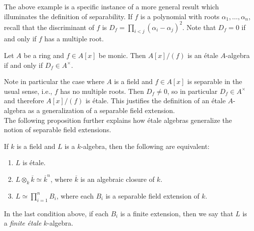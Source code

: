 \documentclass[11pt,openany]{book} %
\begin{document}
The above example is a specific instance of a more general result which illuminates the definition of separability. If $f$ is a polynomial with roots $\alpha_1,\ldots,\alpha_n$, recall that the discriminant of $f$ is $D_f = \prod_{i < j} (\alpha_i - \alpha_j)^2$. Note that $D_f = 0$ if and only if $f$ has a multiple root.

\begin{proposition}
Let $A$ be a ring and $f \in A[x]$ be monic. Then $A[x]/(f)$ is an \'etale $A$-algebra if and only if $D_f \in A^{\times}$.
\end{proposition}
\medskip

Note in particular the case where $A$ is a field and $f \in A[x]$ is separable in the usual sense, i.e., $f$ has no multiple roots. Then $D_f \neq 0$, so in particular $D_f \in A^{\times}$ and therefore $A[x]/(f)$ is \'etale. This justifies the definition of an \'etale $A$-algebra as a generalization of a separable field extension.\\

The following proposition further explains how \'etale algebras generalize the notion of separable field extensions.

\begin{proposition} \label{etalealgebra}
If $k$ is a field and $L$ is a $k$-algebra, then the following are equivalent:
\begin{enumerate}
	\item $L$ is \'etale.
	\item $L \otimes_k \overline{k} \simeq \overline{k}^n$, where $\overline{k}$ is an algebraic closure of $k$.
    \item $L \simeq \prod_{i=1}^{n} B_i$, where each $B_i$ is a separable field extension of $k$.
\end{enumerate}
\end{proposition}

In the last condition above, if each $B_i$ is a finite extension, then we say that $L$ is a \emph{finite \'etale} $k$-algebra.\\

\end{document}
